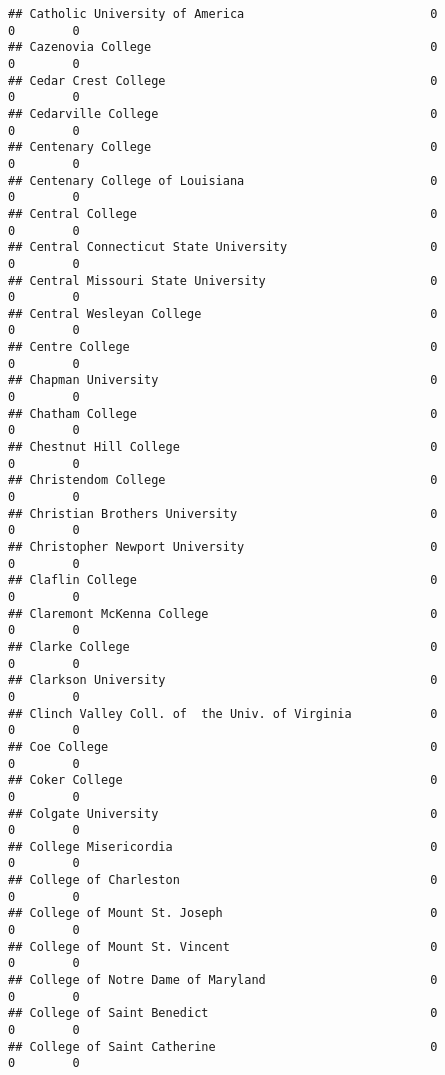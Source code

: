 \documentclass[
]{article}
\begin{document}
\begin{verbatim}
## Catholic University of America                          0           0        0
## Cazenovia College                                       0           0        0
## Cedar Crest College                                     0           0        0
## Cedarville College                                      0           0        0
## Centenary College                                       0           0        0
## Centenary College of Louisiana                          0           0        0
## Central College                                         0           0        0
## Central Connecticut State University                    0           0        0
## Central Missouri State University                       0           0        0
## Central Wesleyan College                                0           0        0
## Centre College                                          0           0        0
## Chapman University                                      0           0        0
## Chatham College                                         0           0        0
## Chestnut Hill College                                   0           0        0
## Christendom College                                     0           0        0
## Christian Brothers University                           0           0        0
## Christopher Newport University                          0           0        0
## Claflin College                                         0           0        0
## Claremont McKenna College                               0           0        0
## Clarke College                                          0           0        0
## Clarkson University                                     0           0        0
## Clinch Valley Coll. of  the Univ. of Virginia           0           0        0
## Coe College                                             0           0        0
## Coker College                                           0           0        0
## Colgate University                                      0           0        0
## College Misericordia                                    0           0        0
## College of Charleston                                   0           0        0
## College of Mount St. Joseph                             0           0        0
## College of Mount St. Vincent                            0           0        0
## College of Notre Dame of Maryland                       0           0        0
## College of Saint Benedict                               0           0        0
## College of Saint Catherine                              0           0        0

\end{verbatim}
\end{document}
